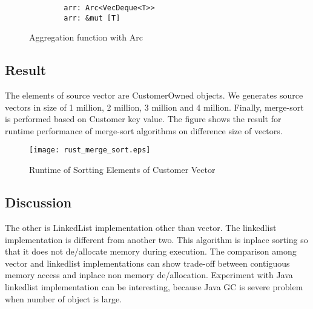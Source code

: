 \begin{figure}[htb]
    \begin{lstlisting}
        arr: Arc<VecDeque<T>>
        arr: &mut [T]
    \end{lstlisting}
    \caption{Aggregation function with Arc}
    \label{fig:Sampling}
\end{figure}


\subsection{Result}
The elements of source vector are CustomerOwned objects. We generates source vectors in size of 1 million, 2 million, 3 million and 4 million. 
Finally, merge-sort is performed based on Customer key value. The figure shows the result for runtime performance of merge-sort algorithms on difference size of vectors.

\begin{figure}[htb]
    \texttt{[image: rust\_merge\_sort.eps]}
    \caption{Runtime of Sortting Elements of Customer Vector}
    \label{fig:Sampling}
\end{figure}

\subsection{Discussion}


The other is LinkedList implementation other than vector.
The linkedlist implementation is different from another two. This algorithm is inplace sorting so that it does not de/allocate memory during execution. 
The comparison among vector and linkedlist implementations can show trade-off between contiguous memory access and inplace non memory de/allocation. 
Experiment with Java linkedlist implementation can be interesting, because Java GC is severe problem when number of object is large. 

